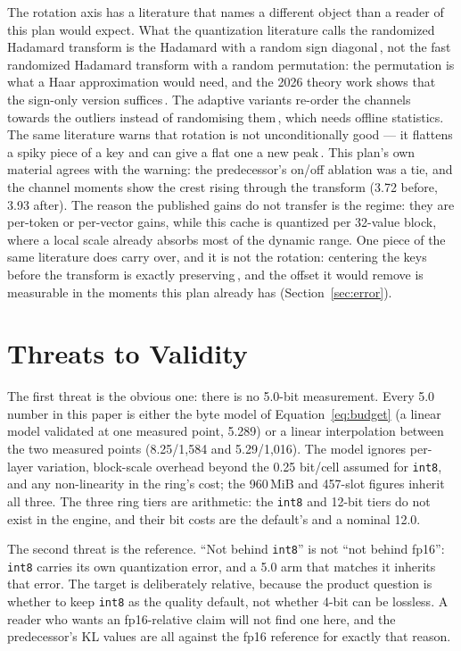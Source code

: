 \documentclass[10pt,twocolumn]{article}
\begin{document}
The rotation axis has a literature that names a different object than a reader of this plan would expect. What the quantization literature calls the randomized Hadamard transform is the Hadamard with a random sign diagonal\,\cite{quip}, not the fast randomized Hadamard transform with a random permutation: the permutation is what a Haar approximation would need, and the 2026 theory work shows that the sign-only version suffices\,\cite{rht-theory}. The adaptive variants re-order the channels towards the outliers instead of randomising them\,\cite{rotatekv}, which needs offline statistics. The same literature warns that rotation is not unconditionally good --- it flattens a spiky piece of a key and can give a flat one a new peak\,\cite{flagrot}. This plan's own material agrees with the warning: the predecessor's on/off ablation was a tie, and the channel moments show the crest rising through the transform (3.72 before, 3.93 after). The reason the published gains do not transfer is the regime: they are per-token or per-vector gains, while this cache is quantized per 32-value block, where a local scale already absorbs most of the dynamic range. One piece of the same literature does carry over, and it is not the rotation: centering the keys before the transform is exactly preserving\,\cite{optr}, and the offset it would remove is measurable in the moments this plan already has (Section~\ref{sec:error}).

\section{Threats to Validity}\label{sec:threats}

The first threat is the obvious one: there is no 5.0-bit measurement. Every 5.0 number in this paper is either the byte model of Equation~\ref{eq:budget} (a linear model validated at one measured point, 5.289) or a linear interpolation between the two measured points (8.25/1,584 and 5.29/1,016). The model ignores per-layer variation, block-scale overhead beyond the 0.25 bit/cell assumed for \texttt{int8}, and any non-linearity in the ring's cost; the 960\,MiB and 457-slot figures inherit all three. The three ring tiers are arithmetic: the \texttt{int8} and 12-bit tiers do not exist in the engine, and their bit costs are the default's and a nominal 12.0.

The second threat is the reference. ``Not behind \texttt{int8}'' is not ``not behind fp16'': \texttt{int8} carries its own quantization error, and a 5.0 arm that matches it inherits that error. The target is deliberately relative, because the product question is whether to keep \texttt{int8} as the quality default, not whether 4-bit can be lossless. A reader who wants an fp16-relative claim will not find one here, and the predecessor's KL values are all against the fp16 reference for exactly that reason.
\end{document}
